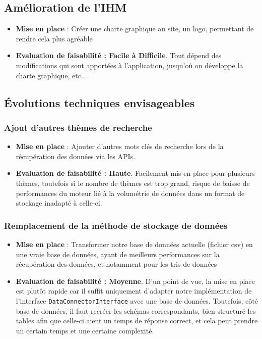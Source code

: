 \documentclass[12pt,a4paper]{article}
\begin{document}
\subsection{Amélioration de l'IHM}
\begin{itemize}
	\item \textbf{Mise en place} : Créer une charte graphique au site, un logo, permettant de rendre cela plus agréable
	\item \textbf{Evaluation de faisabilité : Facile à Difficile}. Tout dépend des modifications qui sont apportées à l'application, jusqu'où on développe la charte graphique, etc...
\end{itemize}

\newpage

\subsection{Évolutions techniques envisageables}

\subsubsection{Ajout d'autres thèmes de recherche}
\begin{itemize}
    \item \textbf{Mise en place} : Ajouter d'autres mots clés de recherche lors de la récupération des données via les APIs.
    \item \textbf{Evaluation de faisabilité : Haute}. Facilement mis en place pour plusieurs thèmes, toutefois si le nombre de thèmes est trop grand, risque de baisse de performances du moteur lié à la volumétrie de données dans un format de stockage inadapté à celle-ci.
\end{itemize}

\subsubsection{Remplacement de la méthode de stockage de données}
\begin{itemize}
	\item \textbf{Mise en place} : Transformer notre base de données actuelle (fichier csv) en une vraie base de données, ayant de meilleurs performances sur la récupération des données, et notamment pour les tris de données
	\item \textbf{Evaluation de faisabilité : Moyenne}. D'un point de vue, la mise en place est plutôt rapide car il suffit uniquement d'adapter notre implémentation de l'interface \texttt{DataConnectorInterface} avec une base de données. Toutefois, côté base de données, il faut recréer les schémas correspondants, bien structuré les tables afin que celle-ci aient un temps de réponse correct, et cela peut prendre un certain temps et une certaine complexité.
\end{itemize}
\end{document}
